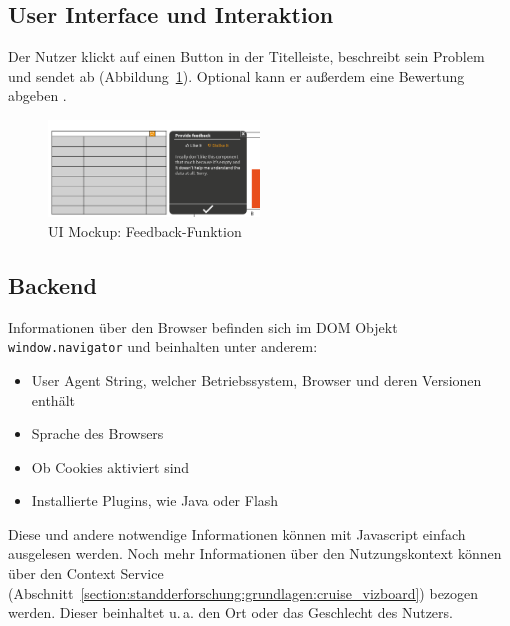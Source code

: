 \documentclass[
	headsepline,
	footsepline,
	fontsize=12pt,
	bibliography=totoc
]{scrbook}
\begin{document}
\subsection{User Interface und Interaktion}
\label{section:konzeption:feedback:ui}

Der Nutzer klickt auf einen Button in der Titelleiste, beschreibt sein Problem und sendet ab (Abbildung~\ref{figure:feedback}). Optional kann er außerdem eine Bewertung abgeben \cite{Voigt2013b}.

\begin{figure}[htbp]
   \centering
   \includegraphics[width=0.5\textwidth]{images/konzeption-reporting.png}
   \caption{UI Mockup: Feedback-Funktion}
   \label{figure:feedback}
\end{figure}

\subsection{Backend}
\label{section:konzeption:feedback:backend}

Informationen über den Browser befinden sich im DOM Objekt \texttt{window.navigator} und beinhalten unter anderem:

\begin{itemize}
	\item User Agent String, welcher Betriebssystem, Browser und deren Versionen enthält
	\item Sprache des Browsers
	\item Ob Cookies aktiviert sind
	\item Installierte Plugins, wie Java oder Flash
\end{itemize}


Diese und andere notwendige Informationen können mit Javascript einfach ausgelesen werden. Noch mehr Informationen über den Nutzungskontext können über den Context Service (Abschnitt~\ref{section:standderforschung:grundlagen:cruise_vizboard}) bezogen werden. Dieser beinhaltet u.\,a. den Ort oder das Geschlecht des Nutzers.
\end{document}
